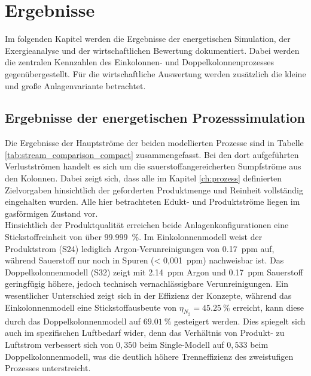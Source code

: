 \chapter{Ergebnisse}
\label{ch:ergebnisse}

Im folgenden Kapitel werden die Ergebnisse der energetischen Simulation, der Exergieanalyse und der wirtschaftlichen Bewertung dokumentiert. Dabei werden die zentralen Kennzahlen des Einkolonnen- und Doppelkolonnenprozesses gegenübergestellt. Für die wirtschaftliche Auswertung werden zusätzlich die kleine und große Anlagenvariante betrachtet.

\section{Ergebnisse der energetischen Prozesssimulation}
\label{sec:ergebinnse_simulation}

Die Ergebnisse der Hauptströme der beiden modellierten Prozesse sind in Tabelle \ref{tab:stream_comparison_compact} zusammengefasst. Bei den dort aufgeführten Verlustströmen handelt es sich um die sauerstoffangereicherten Sumpfströme aus den Kolonnen. Dabei zeigt sich, dass alle im Kapitel \ref{ch:prozess} definierten Zielvorgaben hinsichtlich der geforderten Produktmenge und Reinheit vollständig eingehalten wurden. Alle hier betrachteten Edukt- und Produktströme liegen im gasförmigen Zustand vor. \\
Hinsichtlich der Produktqualität erreichen beide Anlagenkonfigurationen eine Stickstoffreinheit von über \SI{99,999}{\percent}. Im Einkolonnenmodell weist der Produktstrom (S24) lediglich Argon-Verunreinigungen von \SI{0,17}{ppm} auf, während Sauerstoff nur noch in Spuren (\SI{< 0,001}{ppm}) nachweisbar ist. Das Doppelkolonnenmodell (S32) zeigt mit \SI{2,14}{ppm} Argon und \SI{0,17}{ppm} Sauerstoff geringfügig höhere, jedoch technisch vernachlässigbare Verunreinigungen. Ein wesentlicher Unterschied zeigt sich in der Effizienz der Konzepte, während das Einkolonnenmodell eine Stickstoffausbeute von $\eta_{N_2} = \SI{45,25}{\percent}$ erreicht, kann diese durch das Doppelkolonnenmodell auf $\SI{69,01}{\percent}$ gesteigert werden. Dies spiegelt sich auch im spezifischen Luftbedarf wider, denn das Verhältnis von Produkt- zu Luftstrom verbessert sich von $0,350$ beim Single-Modell auf $0,533$ beim Doppelkolonnenmodell, was die deutlich höhere Trenneffizienz des zweistufigen Prozesses unterstreicht.

